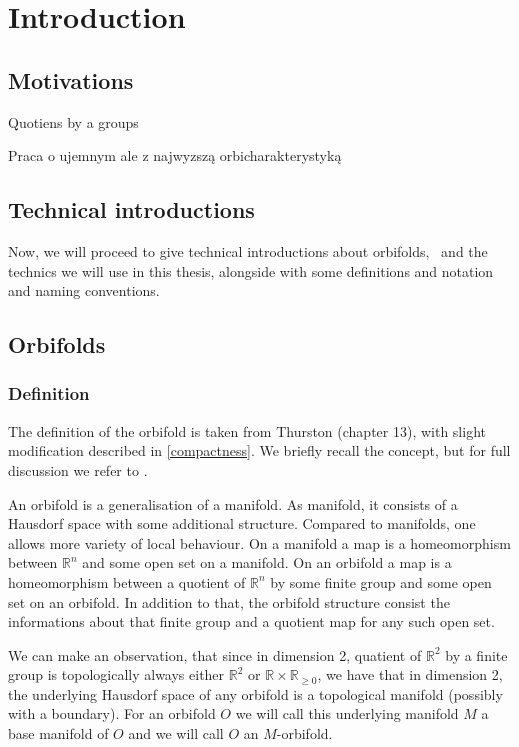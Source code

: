 \chapter{Introduction}
\setcounter{page}{8}
\section{Motivations}
Quotiens by a groups

Praca o ujemnym ale z najwyzszą orbicharakterystyką

\section{Technical introductions}
Now, we will proceed to give technical introductions about orbifolds, \Eoc\ and the 
technics we will use in this thesis, alongside with some definitions and notation and 
naming conventions. 
 
\section{Orbifolds}
\subsection{Definition}
The definition of the orbifold is taken from Thurston \cite{Thurston1979} (chapter 13), 
with slight modification described in \ref{compactness}. 
We briefly recall the concept, but for full discussion we refer to \cite{Thurston1979}. 

An orbifold is a generalisation of a manifold. As manifold, it consists of a Hausdorf space 
with some additional structure. 
Compared to manifolds, one allows more variety of local behaviour. 
On a manifold a map is a homeomorphism between $\mathbb{R}^n$ and some open set on a manifold. 
On an orbifold a map is a homeomorphism between a quotient of $\mathbb{R}^n$ by some 
finite group and some open set on an orbifold. 
In addition to that, the orbifold structure consist the informations about that finite group 
and a quotient map for any such open set. 

We can make an observation, that since in dimension 2, quatient of $\mathbb{R}^2$ by a finite 
group is topologically always either $\mathbb{R}^2$ or $\mathbb{R}\times\mathbb{R}_{\geq 0}$, 
we have that in dimension 2, the underlying Hausdorf space of any orbifold is a topological 
manifold (possibly with a boundary). For an orbifold $O$ we will call this underlying manifold $M$
a base manifold of $O$ and we will call $O$ an $M$-orbifold.  

